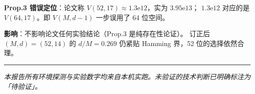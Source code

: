 \documentclass[11pt,a4paper]{ctexart}
\begin{document}
\textbf{Prop.3 错误定位}：论文称 $V(52,17)\approx1.3\text{e}12$，实为 $3.95\text{e}13$；
$1.3\text{e}12$ 对应的是 $V(64,17)$。即 $V(M,d-1)$ 一步误用了 64 位空间。

\textbf{影响}：不影响论文任何实验结论（Prop.3 是纯存在性论证）。
订正后 $(M,d)=(52,14)$ 的 $d/M=0.269$ 仍紧贴 Hamming 界，52 位的选择依然合理。

\vspace{0.5cm}
\begin{center}
\color{rulegray}\rule{0.6\textwidth}{0.4pt}
\end{center}
\begin{center}
\small\itshape
本报告所有环境探测与实验数字均来自本机实跑。未验证的技术判断已明确标注为「待验证」。
\end{center}
\end{document}
